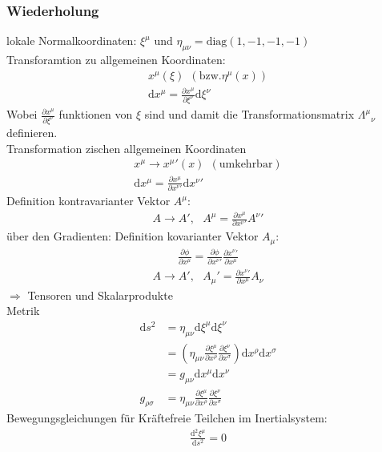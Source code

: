 \documentclass[a4paper]{article}
\begin{document}
\subsubsection{Wiederholung}
lokale Normalkoordinaten: $\xi^\mu$ und
$\eta_{\mu\nu}=\text{diag}(1,-1,-1,-1)$\\
Transforamtion zu allgemeinen Koordinaten:
\begin{align}
x^\mu(\xi) \ \ (\text{bzw.} \eta^\mu(x))\\
\mathrm{d}x^\mu=\frac{\partial x^\mu}{\partial \xi^\nu} \mathrm{d}\xi^\nu 
\end{align}
Wobei $\frac{\partial x^\mu}{\partial \xi^\nu}$ funktionen von $\xi$ sind und
damit die Transformationsmatrix $\Lambda^\mu{}_\nu$ definieren.\\
Transformation zischen allgemeinen Koordinaten
\begin{align}
x^\mu \rightarrow x^\mu{}'(x) \ \ (\text{umkehrbar})\\
\mathrm{d}x^\mu=\frac{\partial x^\mu}{\partial x^\nu{}'} \mathrm{d}x^\nu{}' 
\end{align}
Definition kontravarianter Vektor $A^\mu$:
\begin{align}
A\rightarrow A',\ \ \ A^\mu=\frac{\partial x^\mu}{\partial x^\nu{}'}A^\nu{}'
\end{align}
über den Gradienten:
Definition kovarianter Vektor $A_\mu$:
\begin{align}
\frac{\partial \phi}{\partial x^\mu}=\frac{\partial \phi}{\partial
x^\nu{}'}\frac{\partial x^\nu{}'}{\partial x^\mu{}}
\end{align}
\begin{align}
A\rightarrow A',\ \ \ A_\mu{}'=\frac{\partial x^\nu{}'}{\partial x^\mu}A_\nu
\end{align}
$\Rightarrow$ Tensoren und Skalarprodukte\\
Metrik
\begin{align}
\mathrm{d}s^2&=\eta_{\mu\nu}\mathrm{d}\xi^\mu\mathrm{d}\xi^\nu\\
&=\left( \eta_{\mu\nu} \frac{\partial \xi^\mu}{\partial x^\rho}\frac{\partial
\xi^\nu}{\partial x^\sigma} \right)\mathrm{d}x^\rho\mathrm{d}x^\sigma\\
&=g_{\mu\nu}\mathrm{d}x^\mu\mathrm{d}x^\nu\\
g_{\rho\sigma}&=\eta_{\mu\nu} \frac{\partial \xi^\mu}{\partial
x^\rho}\frac{\partial \xi^\nu}{\partial x^\sigma}
\end{align}
Bewegungsgleichungen für Kräftefreie Teilchen im Inertialsystem: 
\begin{align}
\frac{\mathrm{d}^2\xi^\mu}{\mathrm{d}s^2}=0
\end{align}
\end{document}
